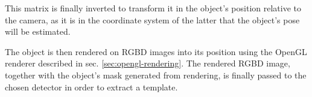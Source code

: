 This matrix is finally inverted to transform it in the object's position
relative to the camera, as it is in the coordinate system of the latter that the
object's pose will be estimated.

The object is then rendered on RGBD images into its position using the OpenGL renderer
described in sec. \ref{sec:opengl-rendering}. The rendered RGBD image, together
with the object's mask generated from rendering, is finally passed to the chosen
detector in order to extract a template. 
